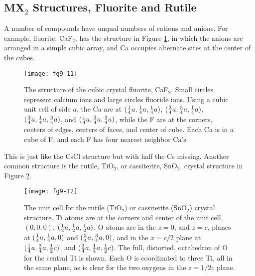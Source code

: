 \subsection{MX$_2$ Structures, Fluorite and Rutile}

A number of compounds have unqual numbers of cations and anions.  For
example, fluorite, CaF$_2$, has the structure in Figure
\ref{chap9-fig11}, in which the anions are arranged in a simple cubic
array, and Ca occupies alternate sites at the center of the cubes.

\begin{figure}
\texttt{[image: fg9-11]}
\caption{The structure of the cubic crystal fluorite, 
CaF$_2$.  Small circles represent calcium ions and large circles fluoride 
ions.  Using a cubic unit cell of side $a$, the Ca are at $({1 \over 
4} a , {1 \over 4} a , {1 \over 4} a)$, $({3 \over 4}a , {3 \over 4} 
a, {1 \over 4} a)$, $({3 \over 4} a , {1 \over 4} a , {3 \over 4} a)$, 
and $({1 \over 4} a, {3 \over 4} a , {3 \over 4} a)$, while the F are at 
the corners, centers of edges, centers of faces, and center of cube.  Each 
Ca is in a cube of F, and each F has four nearest neighbor Ca's.
}
\label{chap9-fig11}
\end{figure}

This is just like the CsCl structure but with half the Cs missing.
Another common structure is the rutile, TiO$_2$, or cassiterite,
SnO$_2$, crystal structure in Figure \ref{chap9-fig12}.

\begin{figure}
\texttt{[image: fg9-12]}
\caption{The unit cell for the rutile (TiO$_2$) or cassiterite 
(SnO$_2$) crystal structure.  Ti atoms are at the corners and center
of the unit cell, $(0,0,0)$, $({1 \over 2} a , {1 \over 2} a, {1 \over
2} a)$.  O atoms are in the $z = 0$, and $z = c$, planes at $({1
\over 4}a , {1 \over 4} a, 0)$ and $( {3 \over 4} a, {3 \over 4} a, 
0)$, and in the $x = c/2$ plane at $({1 \over 4} a, {3 \over 4} a, {1 
\over 2} c)$, and $({3 \over 4} a, {1 \over 4} a , {1 \over 2} c)$.  The 
full, distorted, octahedron of O for the central Ti is
shown.  Each O is coordinated to three Ti, all in the same plane, as is
clear for the two oxygens in the $z = 1/2c$ plane.}
\label{chap9-fig12}
\end{figure}


